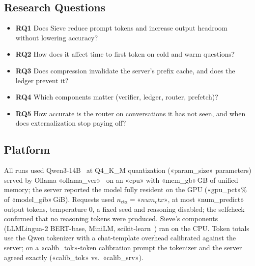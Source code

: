 \documentclass[journal]{IEEEtran}
\begin{document}
\subsection{Research Questions}
\begin{itemize}
\item \textbf{RQ1} Does Sieve reduce prompt tokens and increase output headroom without lowering accuracy?
\item \textbf{RQ2} How does it affect time to first token on cold and warm questions?
\item \textbf{RQ3} Does compression invalidate the server's prefix cache, and does the ledger prevent it?
\item \textbf{RQ4} Which components matter (verifier, ledger, router, prefetch)?
\item \textbf{RQ5} How accurate is the router on conversations it has not seen, and when does externalization stop paying off?
\end{itemize}

\subsection{Platform}
All runs used Qwen3-14B~\cite{qwen3} at Q4\_K\_M quantization («param_size» parameters) served by Ollama «ollama_ver»~\cite{ollama}
on an «cpu» with «mem_gb»\,GB of unified memory; the server reported the model fully resident on the GPU («gpu_pct»\% of
«model_gib»\,GiB). Requests used $n_\text{ctx}=«num_ctx»$, at most «num_predict» output tokens, temperature 0, a fixed seed and
reasoning disabled; the selfcheck confirmed that no reasoning tokens were produced. Sieve's components (LLMLingua-2 BERT-base,
MiniLM, scikit-learn~\cite{pedregosa2011sklearn}) ran on the CPU. Token totals use the Qwen tokenizer with a chat-template overhead
calibrated against the server; on a «calib_tok»-token calibration prompt the tokenizer and the server agreed exactly
(«calib_tok» vs.\ «calib_srv»).
\end{document}
